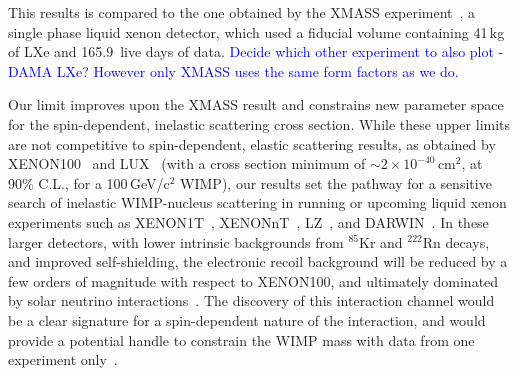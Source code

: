 This results is compared to the one obtained by the XMASS experiment~\cite{Uchida:2014cnn}, a single phase liquid xenon detector, which used a fiducial volume containing 41\,kg of LXe and 165.9~live days of data. \textcolor{blue}{Decide which other experiment to also plot - DAMA LXe? However only XMASS uses the same form factors as we do.}


Our limit improves upon the XMASS result and constrains new parameter space for the spin-dependent, inelastic scattering cross section. While these upper limits are not competitive to spin-dependent, elastic scattering results, as obtained by XENON100~\cite{Aprile:2013doa} and LUX~\cite{Akerib:2016lao} (with a cross section minimum of $\sim2 \times 10^{-40}$\,cm$^{2}$, at 90\% C.L.,  for a 100\,GeV/c$^2$ WIMP), our results set the pathway for a sensitive search of inelastic WIMP-nucleus scattering in running or upcoming liquid xenon experiments such as XENON1T~\cite{Aprile:2015uzo}, XENONnT~\cite{Aprile:2015uzo},  LZ~\cite{Akerib:2015cja}, and DARWIN~\cite{Aalbers:2016jon}. In these larger detectors, with lower intrinsic backgrounds from $^{85}$Kr and $^{222}$Rn decays, and improved self-shielding, the electronic recoil background will be reduced by a few orders of magnitude with respect to XENON100, and ultimately dominated by solar neutrino interactions~\cite{Baudis:2013qla}. 
The discovery of this interaction channel would be a clear signature for a spin-dependent nature of the interaction, and would provide a potential handle  to constrain the WIMP mass with data from one experiment only~\cite{Baudis:2013bba}.

\newpage
